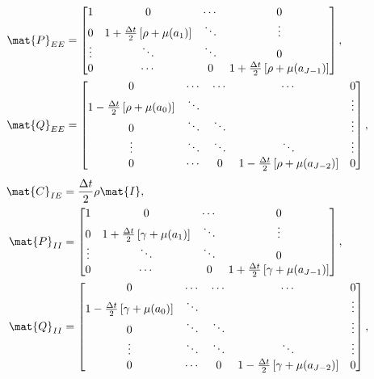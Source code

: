 \documentclass{jpmarticle}
\begin{document}
\begin{equation}
  \begin{split}
    \mat{P}_{EE} &=
    \begin{bmatrix}
      1 & 0 & \cdots & 0
      \\
      0 & 1 + \frac{\Delta t}{2} \left[\rho + \mu(a_1)\right] &
      \ddots & \vdots
      \\
      \vdots & \ddots & \ddots & 0
      \\
      0 & \cdots & 0 &
      1 + \frac{\Delta t}{2} \left[\rho + \mu(a_{J - 1})\right]
    \end{bmatrix},
    \\
    \mat{Q}_{EE} &=
    \begin{bmatrix}
      0 & \cdots & \cdots & \cdots & 0
      \\
      1 - \frac{\Delta t}{2} \left[\rho + \mu(a_0)\right] & \ddots &
      & & \vdots
      \\
      0 & \ddots & \ddots & & \vdots
      \\
      \vdots & \ddots & \ddots & \ddots & \vdots
      \\
      0 & \cdots & 0 &
      1 - \frac{\Delta t}{2} \left[\rho + \mu(a_{J - 2})\right] & 0
    \end{bmatrix},
  \end{split}
\end{equation}
\begin{equation}
  \begin{split}
    \mat{C}_{IE} &=
    \frac{\Delta t}{2} \rho \mat{I},
    \\
    \mat{P}_{II} &=
    \begin{bmatrix}
      1 & 0 & \cdots & 0
      \\
      0 & 1 + \frac{\Delta t}{2} \left[\gamma + \mu(a_1)\right] &
      \ddots & \vdots
      \\
      \vdots & \ddots & \ddots & 0
      \\
      0 & \cdots & 0 &
      1 + \frac{\Delta t}{2} \left[\gamma + \mu(a_{J - 1})\right]
    \end{bmatrix},
    \\
    \mat{Q}_{II} &=
    \begin{bmatrix}
      0 & \cdots & \cdots & \cdots & 0
      \\
      1 - \frac{\Delta t}{2} \left[\gamma + \mu(a_0)\right] & \ddots &
      & & \vdots
      \\
      0 & \ddots & \ddots & & \vdots
      \\
      \vdots & \ddots & \ddots & \ddots & \vdots
      \\
      0 & \cdots & 0 &
      1 - \frac{\Delta t}{2} \left[\gamma + \mu(a_{J - 2})\right] & 0
    \end{bmatrix},
  \end{split}
\end{equation}
\end{document}
